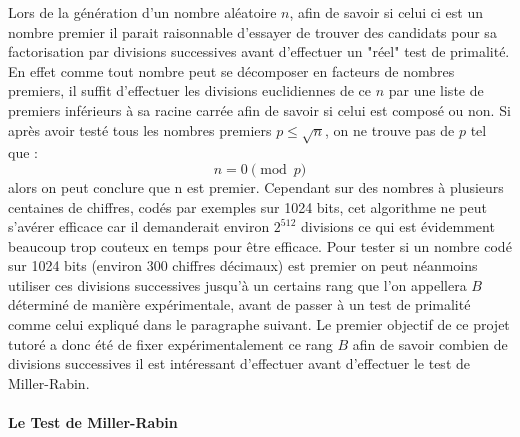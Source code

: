 \documentclass[a4paper,11pt]{article}
\begin{document}
Lors de la génération d'un nombre aléatoire $n$, afin de savoir si celui ci est un nombre premier il parait raisonnable d'essayer de trouver des candidats pour sa factorisation par divisions successives avant d'effectuer un "réel" test de primalité. En effet comme tout nombre peut se décomposer en facteurs de nombres premiers, il suffit d'effectuer les divisions euclidiennes de ce $n$ par une liste de premiers inférieurs à sa racine carrée afin de savoir si celui est composé ou non. Si après avoir testé tous les nombres premiers  $ p \leq \sqrt{n}$, on ne trouve pas de $p$ tel que : $$n=0\pmod{p}$$ alors on peut conclure que n est premier. Cependant sur des nombres à plusieurs centaines de chiffres, codés par exemples sur 1024 bits, cet algorithme ne peut s'avérer efficace car il demanderait environ $ 2^{512} $ divisions ce qui est évidemment beaucoup trop couteux en temps pour être efficace. 
Pour tester si un nombre codé sur 1024 bits (environ 300 chiffres décimaux) est premier on peut néanmoins utiliser ces divisions successives jusqu'à un certains rang que l'on appellera $B$ déterminé de manière expérimentale, avant de passer à un test de primalité comme celui expliqué dans le paragraphe suivant. 
Le premier objectif de ce projet tutoré a donc été de fixer expérimentalement ce rang $B$ afin de savoir combien de divisions successives il est intéressant d'effectuer avant d'effectuer le test de Miller-Rabin.

\paragraph{Le Test de Miller-Rabin} \newline
\end{document}
